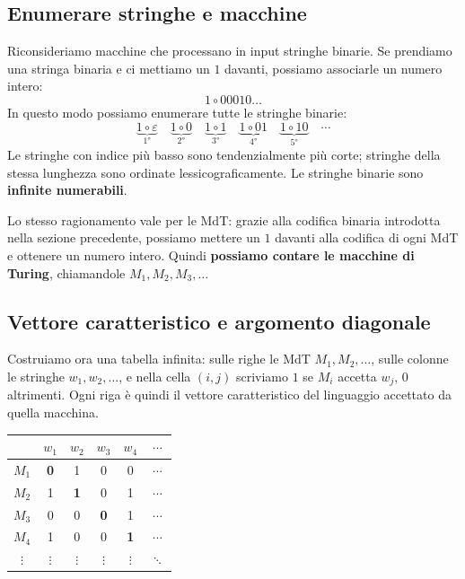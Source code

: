 \subsection{Enumerare stringhe e macchine}

Riconsideriamo macchine che processano in input stringhe binarie. Se prendiamo una stringa binaria e ci mettiamo un $ 1 $ davanti, possiamo associarle un numero intero:
\[
  1 \circ 00010\ldots
\]
In questo modo possiamo enumerare tutte le stringhe binarie:
\[
  \underbrace{1 \circ \varepsilon}_{1°} \quad
  \underbrace{1 \circ 0}_{2°} \quad
  \underbrace{1 \circ 1}_{3°} \quad
  \underbrace{1 \circ 01}_{4°} \quad
  \underbrace{1 \circ 10}_{5°} \quad \cdots
\]
Le stringhe con indice più basso sono tendenzialmente più corte; stringhe della stessa lunghezza sono ordinate lessicograficamente. Le stringhe binarie sono \textbf{infinite numerabili}.

Lo stesso ragionamento vale per le MdT: grazie alla codifica binaria introdotta nella sezione precedente, possiamo mettere un $ 1 $ davanti alla codifica di ogni MdT e ottenere un numero intero. Quindi \textbf{possiamo contare le macchine di Turing}, chiamandole $ M_1, M_2, M_3, \ldots$

\subsection{Vettore caratteristico e argomento diagonale}


Costruiamo ora una tabella infinita: sulle righe le MdT $ M_1, M_2, \ldots $, sulle colonne le stringhe $ w_1, w_2, \ldots $, e nella cella $ (i,j) $ scriviamo $ 1 $ se $ M_i $ accetta $ w_j $, $ 0 $ altrimenti. Ogni riga è quindi il vettore caratteristico del linguaggio accettato da quella macchina.

\begin{center}
\begin{tabular}{c|cccc c}
       & $w_1$ & $w_2$ & $w_3$ & $w_4$ & $\cdots$ \\ \hline
$M_1$  & \textbf{0} & 1 & 0 & 0 & $\cdots$ \\
$M_2$  & 1 & \textbf{1} & 0 & 1 & $\cdots$ \\
$M_3$  & 0 & 0 & \textbf{0} & 1 & $\cdots$ \\
$M_4$  & 1 & 0 & 0 & \textbf{1} & $\cdots$ \\
$\vdots$ & $\vdots$ & $\vdots$ & $\vdots$ & $\vdots$ & $\ddots$
\end{tabular}
\end{center}

